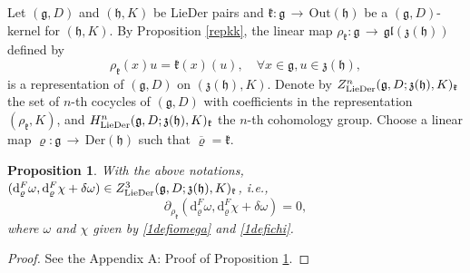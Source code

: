 \documentclass[12pt]{amsart}
\newtheorem{pro}[thm]{Proposition}
\newcommand{\lon }{\,\rightarrow\,}
\newcommand{\g}{\mathfrak g}
\newcommand{\h}{\mathfrak h}
\newcommand{\frkk}{\mathfrak k}
\newcommand{\frkz}{\mathfrak z}
\newcommand{\dM}{\mathrm{d}}
\newcommand{\LD}{{\rm LieDer }}
\newcommand{\Der}{\mathrm{Der}}
\newcommand{\Out}{\mathrm{Out}}
\newcommand{\gl}{\mathfrak {gl}}
\begin{document}
Let $(\g, D)$ and $(\h, K)$ be \LD pairs and $\frkk:\g\lon\Out(\h)$ be a $(\g,D)$-kernel for $(\h,K)$. By Proposition \ref{repkk}, the linear map $\rho_\frkk:\g\lon\gl(\frkz(\h))$ defined by
$$
\rho_\frkk(x)u=\frkk(x)(u), \quad \forall x\in\g, u\in\frkz(\h),
$$
is a representation of $(\g, D)$ on $(\frkz(\h), K)$. Denote by $Z^{n}_{\LD}(\g,D; \frkz(\h), K)_\frkk$ the set of $n$-th cocycles of $(\g, D)$ with coefficients in the representation $(\rho_\frkk, K)$, and $H^{n}_{\LD}(\g, D;\frkz(\h), K)_{\frkk}$ the $n$-th cohomology group. Choose a linear map $\varrho:\g\lon\Der(\h)$ such that $\overline{\varrho}=\frkk$.
\begin{pro}\label{omegachiclosed}
With the above notations, $(\dM^F_{\varrho}\omega, \dM^F_{\varrho}\chi+\delta\omega)\in Z^3_{\LD}(\g,D;\frkz(\h),K)_{\frkk}$, i.e., $$\partial_{\rho_\frkk}(\dM^F_{\varrho}\omega, \dM^F_{\varrho}\chi+\delta\omega)=0,$$
where $\omega$ and $\chi$ given by \eqref{1defiomega} and \eqref{1defichi}.
\end{pro}
 \begin{proof}
     See the Appendix A: Proof of Proposition \ref{omegachiclosed}.
 \end{proof}  
\end{document}

